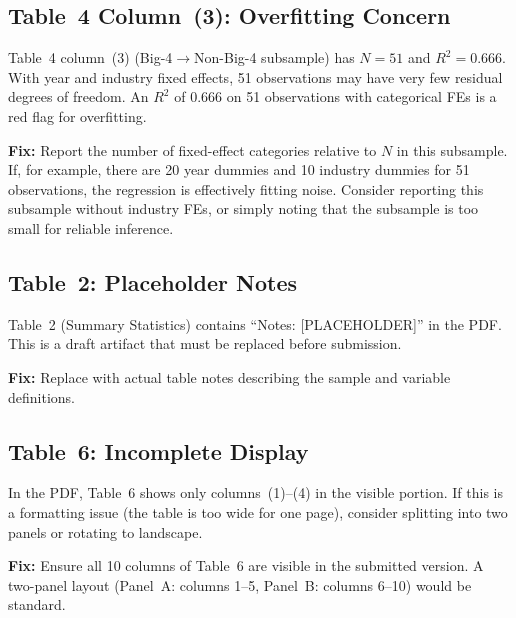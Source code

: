 \documentclass[11pt]{article}
\begin{document}
\subsection{Table~4 Column~(3): Overfitting Concern}

Table~4 column~(3) (Big-4$\to$Non-Big-4 subsample) has $N = 51$ and $R^2 = 0.666$. With year and industry fixed effects, 51 observations may have very few residual degrees of freedom. An $R^2$ of 0.666 on 51 observations with categorical FEs is a red flag for overfitting.

\begin{minorbox}
\textbf{Fix:} Report the number of fixed-effect categories relative to $N$ in this subsample. If, for example, there are 20 year dummies and 10 industry dummies for 51 observations, the regression is effectively fitting noise. Consider reporting this subsample without industry FEs, or simply noting that the subsample is too small for reliable inference.
\end{minorbox}

\subsection{Table~2: Placeholder Notes}

Table~2 (Summary Statistics) contains ``Notes: [PLACEHOLDER]'' in the PDF. This is a draft artifact that must be replaced before submission.

\begin{minorbox}
\textbf{Fix:} Replace with actual table notes describing the sample and variable definitions.
\end{minorbox}

\subsection{Table~6: Incomplete Display}

In the PDF, Table~6 shows only columns~(1)--(4) in the visible portion. If this is a formatting issue (the table is too wide for one page), consider splitting into two panels or rotating to landscape.

\begin{minorbox}
\textbf{Fix:} Ensure all 10 columns of Table~6 are visible in the submitted version. A two-panel layout (Panel~A: columns 1--5, Panel~B: columns 6--10) would be standard.
\end{minorbox}

\end{document}
